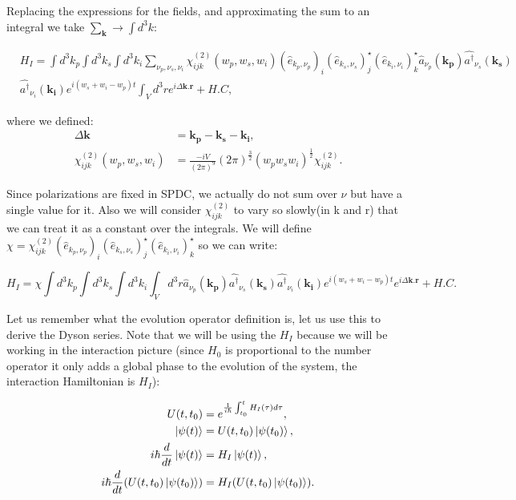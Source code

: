 \documentclass[12pt]{article}
\begin{document}
Replacing the expressions for the fields, and approximating the sum to an integral we take $\sum_{\textbf{k}}\xrightarrow{}\int d^{3}k$:

\begin{align*}
&H_{I}=\int d^{3}k_{p}\int d^{3}k_{s}\int d^{3}k_{i} \sum_{\nu_{p},\nu_{s},\nu_{i}}\chi_{ijk}^{(2)}(w_{p},w_{s},w_{i}) (\hat{e}_{k_{p},\nu_{p}})_{i} (\hat{e}_{k_{s},\nu_{s}})^{\star}_{j} (\hat{e}_{k_{i},\nu_{i}})^{\star}_{k} \hat{a}_{\nu_{p}}(\mathbf{k_{p}})\hat{a^{\dagger}}_{\nu_{s}}(\mathbf{k_{s}})\\
&\hat {a^{\dagger}}_{\nu_{i}}(\mathbf{k_{i}})e^{i(w_{s}+w_{i}-w_{p})t} \int_{V}d^{3}r e^{i \Delta\textbf{k}.\textbf{r}}+H.C ,
\end{align*}

where we defined:
\begin{align}
\Delta \textbf{k}&= \mathbf{k_{p}}-\mathbf{k_{s}}-\mathbf{k_{i}},\\
\chi_{ijk}^{(2)}(w_{p},w_{s},w_{i})&=\frac{-iV}{(2\pi)^9}(2 \pi)^{\frac{3}{2}} (w_{p}w_{s}w_{i})^{\frac{1}{2}}\chi_{ijk}^{(2)}.
\end{align}

Since polarizations are fixed in SPDC, we actually do not sum over $\nu$ but have a single value for it. Also we will consider $\chi_{ijk}^{(2)}$ to vary so slowly(in k and r) that we can treat it as a constant over the integrals. We will define $\chi=\chi_{ijk}^{(2)} (\hat{e}_{k_{p},\nu_{p}})_{i} (\hat{e}_{k_{s},\nu_{s}})^{\star}_{j} (\hat{e}_{k_{i},\nu_{i}})^{\star}_{k}$ so we can write:

\begin{equation}
H_{I}=\chi \int d^{3}k_{p}\int d^{3}k_{s}\int d^{3}k_{i}\int_{V} d^{3}r \hat{a}_{\nu_{p}}(\mathbf{k_{p}})\hat{a^{\dagger}}_{\nu_{s}}(\mathbf{k_{s}})\hat {a^{\dagger}}_{\nu_{i}}(\mathbf{k_{i}})e^{i(w_{s}+w_{i}-w_{p})t}e^{i \Delta\textbf{k}.\textbf{r}}+H.C.
\end{equation}


Let us remember what the evolution operator definition is, let us use this to derive the Dyson series. Note that we will be using the $H_{I}$ because we will be working in the interaction picture (since $H_{0}$ is proportional to the number operator it only adds a global phase to the evolution of the system, the interaction Hamiltonian is $H_{I}$):


\begin{align}
U(t,t_{0})&=e^{\frac{1}{i \hbar} \int_{t_{0}}^{t} H_{I}(\tau) d\tau},\\
\ket{\psi(t)}&=U(t,t_{0})\ket{\psi(t_{0})},\\
i \hbar \frac{d}{dt}\ket{\psi(t)}&=H_{I}\ket{\psi(t)},\\
i \hbar \frac{d}{dt}(U(t,t_{0})\ket{\psi(t_{0})})&=H_{I}(U(t,t_{0})\ket{\psi(t_{0})}). 
\end{align}
\end{document}
